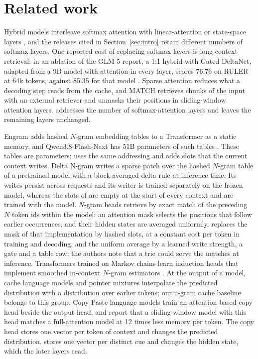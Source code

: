 \section{Related work}
\label{sec:related}

Hybrid models interleave softmax attention with linear-attention or state-space layers
\citep{kimilinear,qwen38fn,nemotron35}, and the releases cited in Section~\ref{sec:intro} retain
different numbers of softmax layers. One reported cost of replacing softmax layers is long-context
retrieval: in an ablation of the GLM-5 report, a 1:1 hybrid with Gated DeltaNet, adapted from a
9B model with attention in every layer, scores 76.76 on RULER at 64k tokens, against 85.35 for
that model \citep{glm5}. Sparse attention
reduces what a decoding step reads from the cache, and MATCH \citep{ma2026match} retrieves chunks of
the input with an external retriever and unmasks their positions in sliding-window attention
layers. \ingram{} addresses the number of softmax-attention layers and leaves the remaining layers
unchanged.

Engram \citep{engram2026} adds hashed $N$-gram embedding tables to a Transformer as a static
memory, and Qwen3.8-Flash-Next has 51B parameters of such tables \citep{qwen38fn}. These tables
are parameters; \ingram{} uses the same addressing and adds slots that the current context writes.
Delta N-gram \citep{wu2026deltangram} writes a sparse patch over the hashed $N$-gram table of a
pretrained model with a block-averaged delta rule at inference time. Its writes persist across requests and its
writer is trained separately on the frozen model, whereas the slots of \ingram{} are empty at the
start of every context and are trained with the model. $N$-gram heads \citep{akyurek2024} retrieve by exact match of the preceding $N$
token ids within the model: an attention mask selects the positions that follow earlier
occurrences, and their hidden states are averaged uniformly. \ingram{} replaces the mask of that
implementation by hashed slots, at a constant cost per token in training and decoding, and the
uniform average by a learned write strength, a gate and a table row; the authors note that a trie
could serve the matches at inference. Transformers trained on Markov chains learn induction heads that
implement smoothed in-context $N$-gram estimators \citep{dangelo2026}. At the output of a model,
cache language models \citep{kuhn1990,grave2017} and pointer mixtures \citep{merity2017}
interpolate the predicted distribution with a distribution over earlier tokens; our n-gram cache
baseline belongs to this group. Copy-Paste language models \citep{godey2026} train an
attention-based copy head beside the output head, and report that a sliding-window model with this
head matches a full-attention model at 12 times less memory per token. The copy head stores one
vector per token of context and changes the predicted distribution. \ingram{} stores one vector
per distinct cue and changes the hidden state, which the later layers read.

